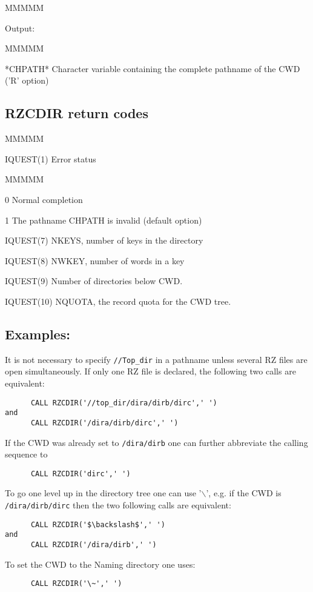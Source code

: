 \begin{DL}{MMMMM}
\item[Output:
]
\begin{DL}{MMMMM}
\item[*CHPATH*
]Character variable containing the complete pathname of the
CWD ('R' option)
\end{DL}
\end{DL}
\subsection{RZCDIR return codes}
\begin{DL}{MMMMM}
\item[IQUEST(1)
]Error status
\begin{DL}{MMMMM}
\item[ 0
]Normal completion
\item[ 1
]The pathname CHPATH is invalid (default option)
\end{DL}
\par
\item[IQUEST(7)
]NKEYS, number of keys in the directory
\item[IQUEST(8)
]NWKEY, number of words in a key
\item[IQUEST(9)
]Number of directories below CWD.
\item[IQUEST(10)
]NQUOTA, the record quota for the CWD tree.
\end{DL}
\subsection{Examples:}
\par It is not necessary to specify {\tt //Top_dir} in a pathname
unless several RZ files are open simultaneously.
If only one RZ file is declared, the following two calls
are equivalent:
\begin{verbatim}
      CALL RZCDIR('//top_dir/dira/dirb/dirc',' ')
and
      CALL RZCDIR('/dira/dirb/dirc',' ')
\end{verbatim}
\par If the CWD was already set to {\tt /dira/dirb}
one can further abbreviate
the calling sequence to
\begin{verbatim}
      CALL RZCDIR('dirc',' ')
\end{verbatim}
\par To go one level up in the directory tree one can use '$\backslash$', e.g.
if the CWD is {\tt /dira/dirb/dirc}
then the two following calls are equivalent:
\begin{verbatim}
      CALL RZCDIR('$\backslash$',' ')
and
      CALL RZCDIR('/dira/dirb',' ')
\end{verbatim}
To set the CWD to the Naming directory one uses:
\begin{verbatim}
      CALL RZCDIR('\~',' ')
\end{verbatim}

